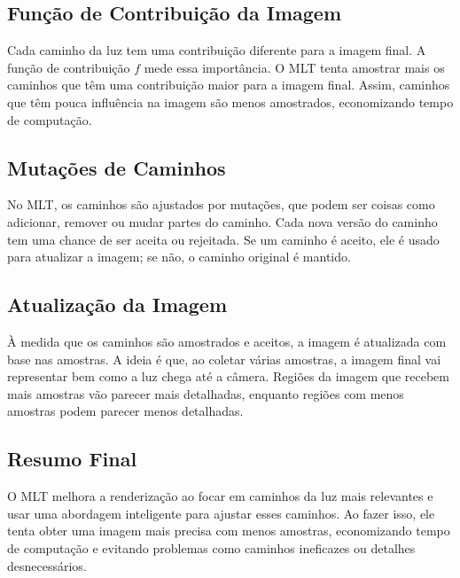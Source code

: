 \documentclass{article}
\begin{document}
\subsection{Função de Contribuição da Imagem}

Cada caminho da luz tem uma contribuição diferente para a imagem final. A função de contribuição \( f \) mede essa importância. O MLT tenta amostrar mais os caminhos que têm uma contribuição maior para a imagem final. Assim, caminhos que têm pouca influência na imagem são menos amostrados, economizando tempo de computação.

\subsection{Mutações de Caminhos}

No MLT, os caminhos são ajustados por mutações, que podem ser coisas como adicionar, remover ou mudar partes do caminho. Cada nova versão do caminho tem uma chance de ser aceita ou rejeitada. Se um caminho é aceito, ele é usado para atualizar a imagem; se não, o caminho original é mantido.

\subsection{Atualização da Imagem}

À medida que os caminhos são amostrados e aceitos, a imagem é atualizada com base nas amostras. A ideia é que, ao coletar várias amostras, a imagem final vai representar bem como a luz chega até a câmera. Regiões da imagem que recebem mais amostras vão parecer mais detalhadas, enquanto regiões com menos amostras podem parecer menos detalhadas.

\subsection{Resumo Final}

O MLT melhora a renderização ao focar em caminhos da luz mais relevantes e usar uma abordagem inteligente para ajustar esses caminhos. Ao fazer isso, ele tenta obter uma imagem mais precisa com menos amostras, economizando tempo de computação e evitando problemas como caminhos ineficazes ou detalhes desnecessários.
\end{document}
